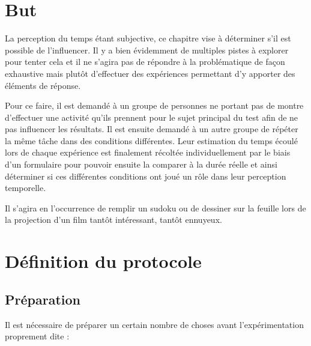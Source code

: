 \documentclass[12pt,fleqn,oneside,openany]{book} %
\begin{document}
\section{But} \label{sec:butExp}
La perception du temps étant subjective, ce chapitre vise à déterminer s'il est possible de l'influencer. Il y a bien évidemment de multiples pistes à explorer pour tenter cela et il ne s'agira pas de répondre à la problématique de façon exhaustive mais plutôt d'effectuer des expériences permettant d'y apporter des éléments de réponse. 

Pour ce faire, il est demandé à un groupe de personnes ne portant pas de montre d'effectuer une activité qu'ils prennent pour le sujet principal du test afin de ne pas influencer les résultats. Il est ensuite demandé à un autre groupe de répéter la même tâche dans des conditions différentes. Leur estimation du temps écoulé lors de chaque expérience est finalement récoltée individuellement par le biais d'un formulaire pour pouvoir ensuite la comparer à la durée réelle et ainsi déterminer si ces différentes conditions ont joué un rôle dans leur perception temporelle.

Il s'agira en l'occurrence de remplir un sudoku ou de dessiner sur la feuille lors de la projection d'un film tantôt intéressant, tantôt ennuyeux. 


\section{Définition du protocole} \label{sec:DefinitionProto}

\subsection{Préparation} \label{ssec:preparation}
Il est nécessaire de préparer un certain nombre de choses avant l'expérimentation proprement dite :
\end{document}
